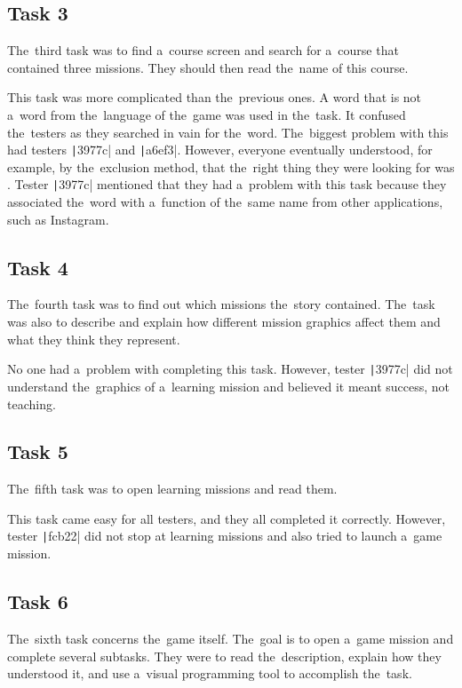 \subsection*{Task 3}

The~third task was to find a~course screen and search for a~course that contained three missions.
They should then read the~name of this course.

This task was more complicated than the~previous ones.
A word that is not a~word from the~language of the~game was used in the~task.
It confused the~testers as they searched in vain for the~word.
The~biggest problem with this had testers \texttt|3977c| and \texttt|a6ef3|.
However, everyone eventually understood, for example, by the~exclusion method, that the~right thing they were looking for was .
Tester \texttt|3977c| mentioned that they had a~problem with this task because they associated the~word  with a~function of the~same name from other applications, such as Instagram.

\subsection*{Task 4}

The~fourth task was to find out which missions the~story contained.
The~task was also to describe and explain how different mission graphics affect them and what they think they represent.

No one had a~problem with completing this task.
However, tester \texttt|3977c| did not understand the~graphics of a~learning mission and believed it meant success, not teaching.

\subsection*{Task 5}

The~fifth task was to open learning missions and read them.

This task came easy for all testers, and they all completed it correctly.
However, tester \texttt|fcb22| did not stop at learning missions and also tried to launch a~game mission.

\subsection*{Task 6}

The~sixth task concerns the~game itself.
The~goal is to open a~game mission and complete several subtasks.
They were to read the~description, explain how they understood it, and use a~visual programming tool to accomplish the~task.

